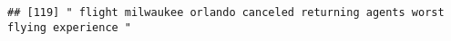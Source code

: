 \documentclass[
]{article}
\begin{document}
\begin{verbatim}
## [119] " flight milwaukee orlando canceled returning agents worst flying experience "                                                                                                                                                                                                                                                                                                                                                                                                                                                                                                                                                                                                                                                                                                                                                                                                                                                                                                                                                                                                                                                                                                                                                                                                                                                                                                                                                                                                                                                                                                                                                                                                                                                                                                                  

\end{verbatim}
\end{document}
